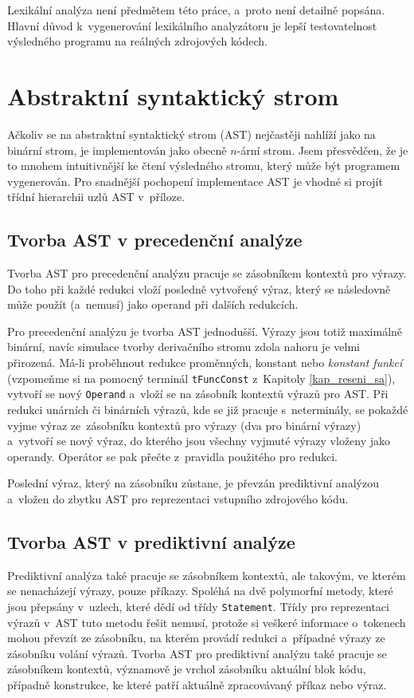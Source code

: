 Lexikální analýza není předmětem této práce, a~proto není detailně popsána.
Hlavní důvod k~vygenerování lexikálního analyzátoru je lepší testovatelnost výsledného programu na reálných zdrojových kódech.

\section{Abstraktní syntaktický strom}
Ačkoliv se na abstraktní syntaktický strom (AST) nejčastěji nahlíží jako na binární strom, je implementován jako obecně $n$-ární strom.
Jsem přesvědčen, že je to mnohem intuitivnější ke čtení výsledného stromu, který může být programem vygenerován.
Pro snadnější pochopení implementace AST je vhodné si projít třídní hierarchii uzlů AST v~příloze. 

\subsection*{Tvorba AST v precedenční analýze}
Tvorba AST pro precedenční analýzu pracuje se zásobníkem kontextů pro výrazy.
Do toho při každé redukci vloží posledně vytvořený výraz, který se následovně může použít (a~nemusí) jako operand při dalších redukcích.

Pro precedenční analýzu je tvorba AST jednodušší.
Výrazy jsou totiž maximálně binární, navíc simulace tvorby derivačního stromu zdola nahoru je velmi přirozená.
Má-li proběhnout redukce proměnných, konstant nebo \emph{konstant funkcí} (vzpomeňme si na pomocný terminál \texttt{tFuncConst} z~Kapitoly \ref{kap_reseni_sa}), vytvoří se nový \texttt{Operand} a~vloží se na zásobník kontextů výrazů pro AST.
Při redukci unárních či binárních výrazů, kde se již pracuje s~neterminály, se pokaždé vyjme výraz ze~zásobníku kontextů pro výrazy (dva pro binární výrazy) a~vytvoří se nový výraz, do kterého jsou všechny vyjmuté výrazy vloženy jako operandy.
Operátor se pak přečte z~pravidla použitého pro redukci.

Poslední výraz, který na zásobníku zůstane, je převzán prediktivní analýzou a~vložen do zbytku AST pro reprezentaci vstupního zdrojového kódu.

\subsection*{Tvorba AST v prediktivní analýze}
Prediktivní analýza také pracuje se zásobníkem kontextů, ale takovým, ve kterém se nenacházejí výrazy, pouze příkazy.
Spoléhá na dvě polymorfní metody, které jsou přepsány v~uzlech, které dědí od třídy \texttt{Statement}.
Třídy pro reprezentaci výrazů v~AST tuto metodu řešit nemusí, protože si veškeré informace o~tokenech mohou převzít ze zásobníku, na kterém provádí redukci a~případné výrazy ze zásobníku volání výrazů.
Tvorba AST pro prediktivní analýzu také pracuje se zásobníkem kontextů, významově je vrchol zásobníku aktuální blok kódu, případně konstrukce, ke které patří aktuálně zpracovávaný příkaz nebo výraz.

